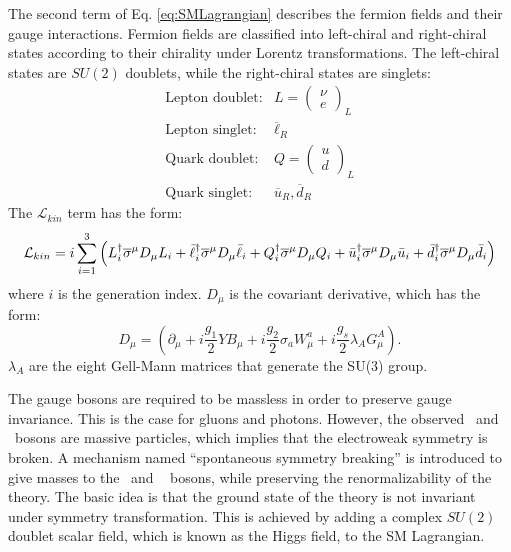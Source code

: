 \documentclass[thesis.tex]{subfiles}
\begin{document}
The second term of Eq. \ref{eq:SMLagrangian} describes the fermion fields and their gauge interactions. 
Fermion fields are classified into left-chiral and right-chiral states according to their chirality under Lorentz transformations. 
The left-chiral states are $SU(2)$ doublets, while the right-chiral states are singlets:
	\begin{equation}
		\begin{array}{cl}
		\text{Lepton doublet}: & L = \left( \begin{array}{c} \nu \\ e \end{array} \right)_L \\
		\text{Lepton singlet}:  & \overline{\ell}_{R} \\
		\text{Quark doublet}:  & Q =  \left( \begin{array}{c} u \\ d \end{array} \right)_L \\
		\text{Quark singlet}:    & \overline{u}_{R}, \overline{d}_{R}
		\end{array}
	\end{equation}
The $\mathcal{L}_{kin}$ term has the form: 
	\begin{equation}
		\mathcal{L}_{kin} = i \sum_{i = 1}^3 \left( L_i^\dagger \mathrm{\overline{\sigma}}^\mu D_\mu L_i +
									\bar{\ell}_i^\dagger \mathrm{\overline{\sigma}}^\mu D_\mu \bar{\ell}_i + 
									Q_i^\dagger \mathrm{\overline{\sigma}}^\mu D_\mu Q_i +
									\bar{u}_i^\dagger \mathrm{\overline{\sigma}}^\mu D_\mu \bar{u}_i +
									\bar{d}_i^\dagger \mathrm{\overline{\sigma}}^\mu D_\mu \bar{d}_i \right)
	\end{equation}
where $i$ is the generation index. $D_\mu$ is the covariant derivative, which has the form: 
	\begin{equation}
		D_\mu = (\partial_\mu + i \frac{g_1}{2}YB_\mu + i \frac{g_2}{2}\sigma_a W_\mu^a + i\frac{g_s}{2} \lambda_A G_\mu^{A} ).
	\end{equation}
$\lambda_A$ are the eight Gell-Mann matrices that generate the SU(3) group. 
 
The gauge bosons are required to be massless in order to preserve gauge invariance. 
This is the case for gluons and photons. 
However, the observed \PWpm~and \PZ~bosons are massive particles, which implies that the electroweak symmetry is broken. 
A mechanism named ``spontaneous symmetry breaking''\cite{PhysRevLett.13.508, PhysRevLett.13.321, PhysRevLett.13.585} is introduced to give masses to the \PWpm~and \PZ~ bosons, while preserving the renormalizability of the theory. 
The basic idea is that the ground state of the theory is not invariant under symmetry transformation.
This is achieved by adding a complex $SU(2)$ doublet scalar field, which is known as the Higgs field, to the SM Lagrangian. 
\end{document}
